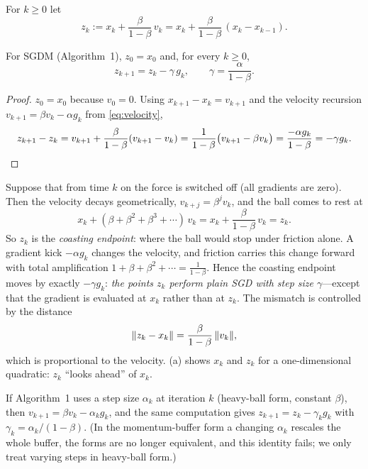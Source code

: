 \begin{definition}
For $k\ge0$ let
\begin{equation}\label{eq:z}
  z_k:=x_k+\frac{\beta}{1-\beta}\,v_k=x_k+\frac{\beta}{1-\beta}\,(x_k-x_{k-1}).
\end{equation}
\end{definition}

\begin{lemma}\label{lem:z}
For SGDM (Algorithm~1), $z_0=x_0$ and, for every $k\ge0$,
\begin{equation}\label{eq:z-sgd}
  z_{k+1}=z_k-\gamma\,g_k,\qquad\gamma=\frac{\alpha}{1-\beta}.
\end{equation}
\end{lemma}

\begin{proof}
$z_0=x_0$ because $v_0=0$. Using $x_{k+1}-x_k=v_{k+1}$ and the velocity recursion
$v_{k+1}=\beta v_k-\alpha g_k$ from \eqref{eq:velocity},
\[
  z_{k+1}-z_k=v_{k+1}+\frac{\beta}{1-\beta}(v_{k+1}-v_k)
  =\frac{1}{1-\beta}\bigl(v_{k+1}-\beta v_k\bigr)=\frac{-\alpha g_k}{1-\beta}=-\gamma g_k .\qedhere
\]
\end{proof}

\begin{tcolorbox}[intuition,title=Physical meaning of $z_k$]
Suppose that from time $k$ on the force is switched off (all gradients are zero). Then
the velocity decays geometrically, $v_{k+j}=\beta^jv_k$, and the ball comes to rest at
\[
  x_k+(\beta+\beta^2+\beta^3+\cdots)\,v_k=x_k+\frac{\beta}{1-\beta}\,v_k=z_k .
\]
So $z_k$ is the \emph{coasting endpoint}: where the ball would stop under friction alone.
A gradient kick $-\alpha g_k$ changes the velocity, and friction carries this change
forward with total amplification $1+\beta+\beta^2+\cdots=\frac1{1-\beta}$. Hence the
coasting endpoint moves by exactly $-\gamma g_k$: \emph{the points $z_k$ perform plain
SGD with step size $\gamma$}---except that the gradient is evaluated at $x_k$ rather than
at $z_k$. The mismatch is controlled by the distance
\begin{equation}\label{eq:z-minus-x}
  \lVert z_k-x_k\rVert=\frac{\beta}{1-\beta}\,\lVert v_k\rVert,
\end{equation}
which is proportional to the velocity. (a) shows $x_k$ and $z_k$ for
a one-dimensional quadratic: $z_k$ ``looks ahead'' of $x_k$.
\end{tcolorbox}

\begin{remark}\label{rem:varying}
If Algorithm~1 uses a step size $\alpha_k$ at iteration $k$ (heavy-ball form, constant
$\beta$), then $v_{k+1}=\beta v_k-\alpha_kg_k$, and the same computation gives
$z_{k+1}=z_k-\gamma_kg_k$ with $\gamma_k=\alpha_k/(1-\beta)$. (In the momentum-buffer form
a changing $\alpha_k$ rescales the whole buffer, the forms are no longer equivalent, and
this identity fails; we only treat varying steps in heavy-ball form.)
\end{remark}

